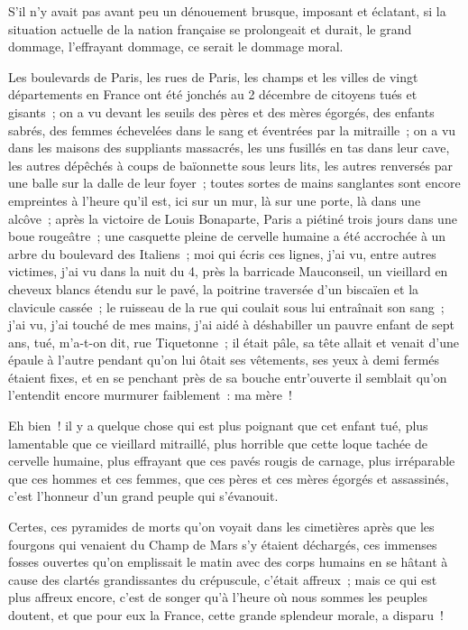 \documentclass[french,twoside]{book} %
\begin{document}
\noindent S’il n’y avait pas avant peu un dénouement brusque, imposant et éclatant, si la situation actuelle de la nation française se prolongeait et durait, le grand dommage, l’effrayant dommage, ce serait le dommage moral.\par
Les boulevards de Paris, les rues de Paris, les champs et les villes de vingt départements en France ont été jonchés au 2 décembre de citoyens tués et gisants ; on a vu devant les seuils des pères et des mères égorgés, des enfants sabrés, des femmes échevelées dans le sang et éventrées par la mitraille ; on a vu dans les maisons des suppliants massacrés, les uns fusillés en tas dans leur cave, les autres dépêchés à coups de baïonnette sous leurs lits, les autres renversés par une balle sur la dalle de leur foyer ; toutes sortes de mains sanglantes sont encore empreintes à l’heure qu’il est, ici sur un mur, là sur une porte, là dans une alcôve ; après la victoire de Louis Bonaparte, Paris a piétiné trois jours dans une boue rougeâtre ; une casquette pleine de cervelle humaine a été accrochée à un arbre du boulevard des Italiens ; moi qui écris ces lignes, j’ai vu, entre autres victimes, j’ai vu dans la nuit du 4, près la barricade Mauconseil, un vieillard en cheveux blancs étendu sur le pavé, la poitrine traversée d’un biscaïen et la clavicule cassée ; le ruisseau de la rue qui coulait sous lui entraînait son sang ; j’ai vu, j’ai touché de mes mains, j’ai aidé à déshabiller un pauvre enfant de sept ans, tué, m’a-t-on dit, rue Tiquetonne ; il était pâle, sa tête allait et venait d’une épaule à l’autre pendant qu’on lui ôtait ses vêtements, ses yeux à demi fermés étaient fixes, et en se penchant près de sa bouche entr’ouverte il semblait qu’on l’entendit encore murmurer faiblement : ma mère !\par
Eh bien ! il y a quelque chose qui est plus poignant que cet enfant tué, plus lamentable que ce vieillard mitraillé, plus horrible que cette loque tachée de cervelle humaine, plus effrayant que ces pavés rougis de carnage, plus irréparable que ces hommes et ces femmes, que ces pères et ces mères égorgés et assassinés, c’est l’honneur d’un grand peuple qui s’évanouit.\par
Certes, ces pyramides de morts qu’on voyait dans les cimetières après que les fourgons qui venaient du Champ de Mars s’y étaient déchargés, ces immenses fosses ouvertes qu’on emplissait le matin avec des corps humains en se hâtant à cause des clartés grandissantes du crépuscule, c’était affreux ; mais ce qui est plus affreux encore, c’est de songer qu’à l’heure où nous sommes les peuples doutent, et que pour eux la France, cette grande splendeur morale, a disparu !\par
\end{document}
